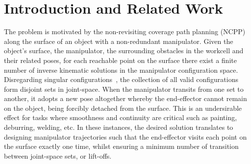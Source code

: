 \documentclass[conference]{IEEEtran}
\begin{document}
\section{Introduction and Related Work}
The problem is motivated by the non-revisiting coverage path planning (NCPP) along the surface of an object with a non-redundant manipulator. 
Given the object's surface, the manipulator, 
the surrounding obstacles in the workcell and their related poses, for each reachable point on the surface there exist a finite number of inverse kinematic solutions in the manipulator configuration space. 
Disregarding singular configurations~\cite{Yoshikawa1990Translational}, the collection of all valid configurations form disjoint sets in joint-space. When the manipulator transits from one set to another, it adopts a new pose altogether whereby the end-effector cannot remain on the object, being forcibly detached from the surface. This is an undersirable effect for tasks where smoothness and continuity are critical such as painting, deburring, welding, etc. 
In these instances, the desired solution translates to designing manipulator trajectories such that the end-effector visits each point on the surface exactly one time, whilst ensuring a minimum number of transition between joint-space sets, or lift-offs. 

\end{document}
